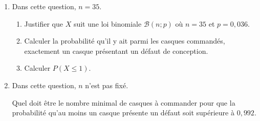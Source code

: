 \begin{enumerate}
	\item Dans cette question, $n=35$.
	\begin{enumerate}
		\item Justifier que $X$ suit une loi binomiale $\mathcal{B} (n;p)$ où $n=35$ et $p=0,036$.
		\item Calculer la probabilité qu'il y ait parmi les casques commandés, exactement un casque présentant un défaut de conception.
		\item Calculer $P(X \leqslant 1)$.
	\end{enumerate}
	\item Dans cette question, $n$ n'est pas fixé.
	
	Quel doit être le nombre minimal de casques à commander pour que la probabilité qu'au moins un casque présente un défaut soit supérieure à $0,992$.
\end{enumerate}

